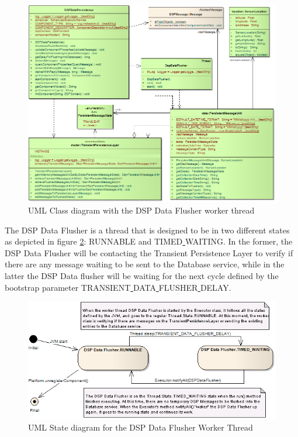 \begin{figure}[!b]
  \centering
  \includegraphics[scale=0.5]{../diagrams/DSP-DataPersistence-Flusher-Classes}
  \caption{UML Class diagram with the DSP Data Flusher worker thread}
  \label{fig:DSP-DataPersistence-Flusher-Classes}
\end{figure}

The DSP Data Flusher is a thread that is designed to be in two different
states as depicted in figure
\ref{fig:DSP-DataPersistence-Flusher-State-Diagram}: RUNNABLE and
TIMED\underline{ }WAITING. In the former, the DSP Data Flusher will be
contacting the Transient Persistence Layer to verify if there are any message
waiting to be sent to the Database service, while in the latter the DSP Data
flusher will be waiting for the next cycle defined by the bootstrap parameter
TRANSIENT\underline{ }DATA\underline{ }FLUSHER\underline{ }DELAY.

\begin{figure}[!b]
  \centering
  \includegraphics[scale=0.5]{../diagrams/DSP-DataPersistence-Flusher-State-Diagram}
  \caption{UML State diagram for the DSP Data Flusher Worker Thread}
  \label{fig:DSP-DataPersistence-Flusher-State-Diagram}
\end{figure}

